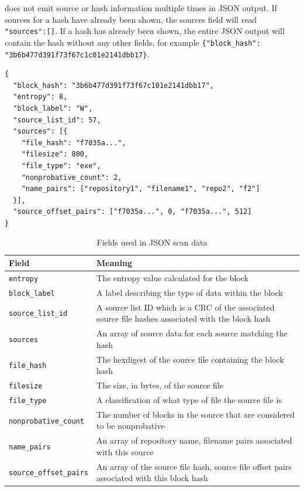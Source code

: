 \documentclass[11pt,fleqn]{article} %
\begin{document}
\hdb does not emit source or hash information multiple times in JSON output.  If sources for a hash have already been shown, the sources field will read \verb+"sources":[]+. If a hash has already been shown, the entire JSON output will contain the hash without any other fields, for example \verb+{"block_hash":+ \verb+"3b6b477d391f73f67c1c01e2141dbb17}+.\\

\lstset{style=customfile}
\begin{lstlisting}[float, caption={Example JSON block hash data output from a scan match, with line breaks added for readability}, label=JSONScanData]
{
  "block_hash": "3b6b477d391f73f67c101e2141dbb17",
  "entropy": 8,
  "block_label": "W",
  "source_list_id": 57,
  "sources": [{
    "file_hash": "f7035a...",
    "filesize": 800,
    "file_type": "exe",
    "nonprobative_count": 2,
    "name_pairs": ["repository1", "filename1", "repo2", "f2"]
  }],
  "source_offset_pairs": ["f7035a...", 0, "f7035a...", 512]
}
\end{lstlisting}

\begin{table}[!ht]

\centering
\caption{Fields used in JSON scan data}
\label{tab:JSONScanData}
\begin{tabular}{|p{5 cm}|p{8.8 cm}|}
\hline \hline
\textbf{Field} & \textbf{Meaning} \\
\hline
\verb+entropy+ & The entropy value calculated for the block\\
\hline
\verb+block_label+ & A label describing the type of data within the block\\
\hline
\verb+source_list_id+ & A source list ID which is a CRC of the associated source file hashes associated with the block hash\\
\hline
\verb+sources+ & An array of source data for each source matching the hash\\
\hline
\verb+file_hash+ & The hexdigest of the source file containing the block hash\\
\hline
\verb+filesize+ & The size, in bytes, of the source file\\
\hline
\verb+file_type+ & A classification of what type of file the source file is\\
\hline
\verb+nonprobative_count+ & The number of blocks in the source that are considered to be nonprobative\\
\hline
\verb+name_pairs+ & An array of repository name, filename pairs associated with this source\\
\hline
\verb+source_offset_pairs+ & An array of the source file hash, source file offset pairs associated with this block hash\\
\hline
\end{tabular}
\end{table}
\end{document}
